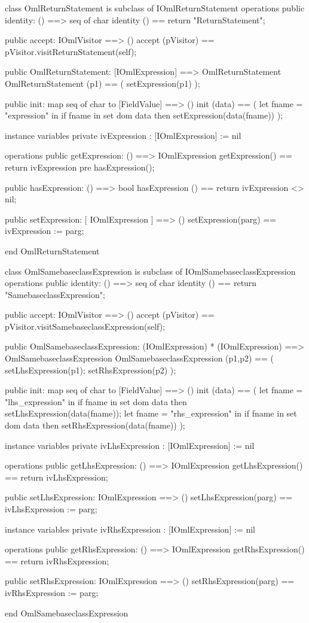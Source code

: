 \begin{vdm_al}
class OmlReturnStatement is subclass of IOmlReturnStatement
operations
  public identity: () ==> seq of char
  identity () == return "ReturnStatement";

  public accept: IOmlVisitor ==> ()
  accept (pVisitor) == pVisitor.visitReturnStatement(self);

  public OmlReturnStatement:
      [IOmlExpression] ==> OmlReturnStatement
  OmlReturnStatement (p1) == 
   ( setExpression(p1) );

  public init: map seq of char to [FieldValue] ==> ()
  init (data) ==
    ( let fname = "expression" in
        if fname in set dom data
        then setExpression(data(fname)) );

instance variables
  private ivExpression : [IOmlExpression] := nil

operations
  public getExpression: () ==> IOmlExpression
  getExpression() == return ivExpression
    pre hasExpression();

  public hasExpression: () ==> bool
  hasExpression () == return ivExpression <> nil;

  public setExpression: [ IOmlExpression ] ==> ()
  setExpression(parg) == ivExpression := parg;

end OmlReturnStatement
\end{vdm_al}

\begin{vdm_al}
class OmlSamebaseclassExpression is subclass of IOmlSamebaseclassExpression
operations
  public identity: () ==> seq of char
  identity () == return "SamebaseclassExpression";

  public accept: IOmlVisitor ==> ()
  accept (pVisitor) == pVisitor.visitSamebaseclassExpression(self);

  public OmlSamebaseclassExpression:
      (IOmlExpression) *
      (IOmlExpression) ==> OmlSamebaseclassExpression
  OmlSamebaseclassExpression (p1,p2) == 
   ( setLhsExpression(p1);
     setRhsExpression(p2) );

  public init: map seq of char to [FieldValue] ==> ()
  init (data) ==
    ( let fname = "lhs_expression" in
        if fname in set dom data
        then setLhsExpression(data(fname));
      let fname = "rhs_expression" in
        if fname in set dom data
        then setRhsExpression(data(fname)) );

instance variables
  private ivLhsExpression : [IOmlExpression] := nil

operations
  public getLhsExpression: () ==> IOmlExpression
  getLhsExpression() == return ivLhsExpression;

  public setLhsExpression: IOmlExpression ==> ()
  setLhsExpression(parg) == ivLhsExpression := parg;

instance variables
  private ivRhsExpression : [IOmlExpression] := nil

operations
  public getRhsExpression: () ==> IOmlExpression
  getRhsExpression() == return ivRhsExpression;

  public setRhsExpression: IOmlExpression ==> ()
  setRhsExpression(parg) == ivRhsExpression := parg;

end OmlSamebaseclassExpression
\end{vdm_al}


